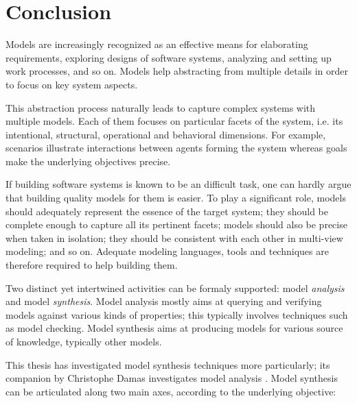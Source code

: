 \chapter{Conclusion\label{chapter:conclusion}}

Models are increasingly recognized as an effective means for elaborating requirements, exploring designs of software systems, analyzing and setting up work processes, and so on. Models help abstracting from multiple details in order to focus on key system aspects.

This abstraction process naturally leads to capture complex systems with multiple models. Each of them focuses on particular facets of the system, i.e. its intentional, structural, operational and behavioral dimensions. For example, scenarios illustrate interactions between agents forming the system whereas goals make the underlying objectives precise.

If building software systems is known to be an difficult task, one can hardly argue that building quality models for them is easier.  To play a significant role, models should adequately represent the essence of the target system; they should be complete enough to capture all its pertinent facets; models should also be precise when taken in isolation; they should be consistent with each other in multi-view modeling; and so on. Adequate modeling languages, tools and techniques are therefore required to help building them.

Two distinct yet intertwined activities can be formaly supported: model \emph{analysis} and model \emph{synthesis}. Model analysis mostly aims at querying and verifying models against various kinds of properties; this typically involves techniques such as model checking. Model synthesis aims at producing models for various source of knowledge, typically other models.

This thesis has investigated model synthesis techniques more particularly; its companion by Christophe Damas investigates model analysis \cite{Damas:2011}. Model synthesis can be articulated along two main axes, according to the underlying objective:

